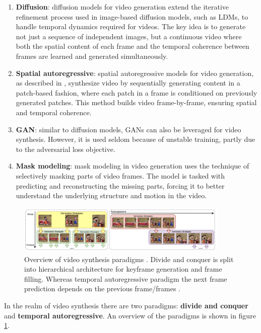 \begin{enumerate}
    \item \textbf{Diffusion}: diffusion models for video generation extend the iterative refinement process used in image-based diffusion models, such as LDMs, to handle temporal dynamics required for videos. The key idea is to generate not just a sequence of independent images, but a continuous video where both the spatial content of each frame and the temporal coherence between frames are learned and generated simultaneously.
    \item \textbf{Spatial autoregressive}: spatial autoregressive models for video generation, as described in \cite{graves2013generating}, synthesize video by sequentially generating content in a patch-based fashion, where each patch in a frame is conditioned on previously generated patches. This method builds video frame-by-frame, ensuring spatial and temporal coherence.
    \item \textbf{GAN}: similar to diffusion models, GANs can also be leveraged for video synthesis. However, it is used seldom because of unstable training, partly due to the adversarial loss objective.
    \item \textbf{Mask modeling}: mask modeling in video generation uses the technique of selectively masking parts of video frames. The model is tasked with predicting and reconstructing the missing parts, forcing it to better understand the underlying structure and motion in the video.
\end{enumerate}

\begin{figure}
    \centering
    \includegraphics[width=0.9\textwidth]{images/video_synthesis/paradigms.png}
    \caption{Overview of video synthesis paradigms \cite{long_video_survey}. Divide and conquer is split into hierarchical architecture for keyframe generation and frame filling. Whereas temporal autoregressive paradigm the next frame prediction depends on the previous frame/frames \cite{long_video_survey}.}
    \label{fig:video_synthesis_paradigms}
\end{figure}

In the realm of video synthesis there are two paradigms: \textbf{divide and conquer} and \textbf{temporal autoregressive}. An overview of the paradigms is shown in figure \ref{fig:video_synthesis_paradigms}.



